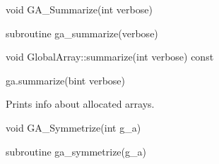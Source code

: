 \documentclass[12pt]{article}
\begin{document}
\begin{capi}
\begin{ccode}
void GA_Summarize(int verbose)
\end{ccode}
\begin{funcargs}
\end{funcargs}
\end{capi}

\begin{fapi}
\begin{fcode}
subroutine ga_summarize(verbose)
\end{fcode}
\begin{funcargs}
\end{funcargs}
\end{fapi}

\begin{cxxapi}
\begin{cxxcode}
void GlobalArray::summarize(int verbose) const
\end{cxxcode}
\begin{funcargs}
\end{funcargs}
\end{cxxapi}

\begin{pyapi}
\begin{pycode}
ga.summarize(bint verbose)
\end{pycode}
\begin{funcargs}
\end{funcargs}
\end{pyapi}

\local

\begin{desc}
Prints info about allocated arrays.
\end{desc}


\begin{capi}
\begin{ccode}
void GA_Symmetrize(int g_a)
\end{ccode}
\begin{funcargs}
\end{funcargs}
\end{capi}

\begin{fapi}
\begin{fcode}
subroutine ga_symmetrize(g_a)
\end{fcode}
\begin{funcargs}
\end{funcargs}
\end{fapi}
\end{document}
